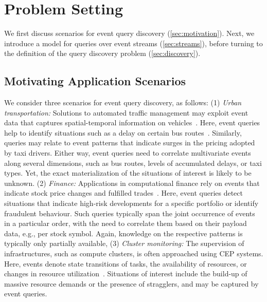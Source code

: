 \section{Problem Setting}
\label{sec:problem}
We first discuss scenarios for event query discovery
(\autoref{sec:motivation}). Next, we
introduce a model for queries over event streams
(\autoref{sec:streams}),
before turning to the definition of the query discovery problem
(\autoref{sec:discovery}).
\subsection{Motivating Application Scenarios}
\label{sec:motivation}
We consider three scenarios for event query discovery, as follows:
(1) \emph{Urban transportation:} Solutions to automated traffic management
may exploit event data that captures spatial-temporal information on
vehicles~\cite{DBLP:conf/edbt/ArtikisWSBLPBMKMGMGK14}. Here, event queries
help to identify situations such as a delay on
certain bus routes~\cite{yu2011bus}. Similarly, queries may relate to event
patterns that
indicate surges in the pricing adopted by taxi drivers. Either way, event
queries need to correlate multivariate events along several dimensions, such
as bus routes, levels of accumulated delays, or taxi types. Yet, the exact
materialization of the situations of interest is likely to be unknown.
(2) \emph{Finance:} Applications in computational finance rely on
events
that indicate stock price changes and fulfilled
trades~\cite{DBLP:journals/computer/ChandramouliAGSR10}. Here, event queries
detect situations that indicate high-risk developments for a
specific portfolio or identify fraudulent behaviour. Such queries typically
span the joint
occurrence of events in a particular order, with the need to correlate them
based on their payload data, e.g., per stock symbol. Again, knowledge on the
respective patterns is typically only
partially available, 
(3) \emph{Cluster monitoring:} The supervision of
infrastructures, such as compute clusters, is often approached using CEP
systems. Here, events denote state transitions of tasks, the availability
of resources, or changes in resource utilization~\cite{reiss2012towards}.
Situations of interest include the build-up of massive resource demands or
the presence of stragglers, and may be captured by event queries.
